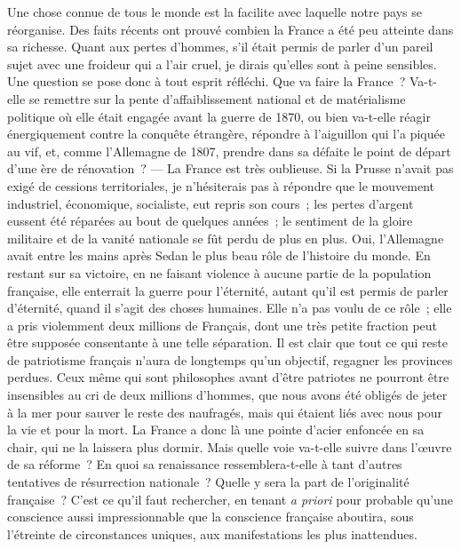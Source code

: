 \documentclass[french,twoside]{book} %
\begin{document}
\noindent Une chose connue de tous le monde est la facilite avec laquelle notre pays se réorganise. Des faits récents ont prouvé combien la France a été peu atteinte dans sa richesse. Quant aux pertes d’hommes, s’il était permis de parler d’un pareil sujet avec une froideur qui a l’air cruel, je dirais qu’elles sont à peine sensibles. Une question se pose donc à tout esprit réfléchi. Que va faire la France ? Va-t-elle se remettre sur la pente d’affaiblissement national et de matérialisme politique où elle était engagée avant la guerre de 1870, ou bien va-t-elle réagir énergiquement contre la conquête étrangère, répondre à l’aiguillon qui l’a piquée au vif, et, comme l’Allemagne de 1807, prendre dans sa défaite le point de départ d’une ère de rénovation ? — La France est très oublieuse. Si la Prusse n’avait pas exigé de cessions territoriales, je n’hésiterais pas à répondre que le mouvement industriel, économique, socialiste, eut repris son cours ; les pertes d’argent eussent été réparées au bout de quelques années ; le sentiment de la gloire militaire et de la vanité nationale se fût perdu de plus en plus. Oui, l’Allemagne avait entre les mains après Sedan le plus beau rôle de l’histoire du monde. En restant sur sa victoire, en ne faisant violence à aucune partie de la population française, elle enterrait la guerre pour l’éternité, autant qu’il est permis de parler d’éternité, quand il s’agit des choses humaines. Elle n’a pas voulu de ce rôle ; elle a pris violemment deux millions de Français, dont une très petite fraction peut être supposée consentante à une telle séparation. Il est clair que tout ce qui reste de patriotisme français n’aura de longtemps qu’un objectif, regagner les provinces perdues. Ceux même qui sont philosophes avant d’être patriotes ne pourront être insensibles au cri de deux millions d’hommes, que nous avons été obligés de jeter à la mer pour sauver le reste des naufragés, mais qui étaient liés avec nous pour la vie et pour la mort. La France a donc là une pointe d’acier enfoncée en sa chair, qui ne la laissera plus dormir. Mais quelle voie va-t-elle suivre dans l’œuvre de sa réforme ? En quoi sa renaissance ressemblera-t-elle à tant d’autres tentatives de résurrection nationale ? Quelle y sera la part de l’originalité française ? C’est ce qu’il faut rechercher, en tenant {\itshape a priori} pour probable qu’une conscience aussi impressionnable que la conscience française aboutira, sous l’étreinte de circonstances uniques, aux manifestations les plus inattendues.\par
\end{document}
